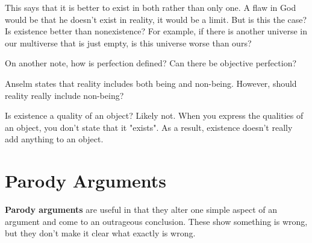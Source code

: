 \documentclass{article}
\begin{document}
This says that it is better to exist in both rather than only one. A flaw in God
would be that he doesn't exist in reality, it would be a limit. But is this the
case? Is existence better than nonexistence? For example, if there is another
universe in our multiverse that is just empty, is this universe worse than ours?

On another note, how is perfection defined? Can there be objective perfection?

Anselm states that reality includes both being and non-being. However, should
reality really include non-being?

Is existence a quality of an object? Likely not. When you express the qualities
of an object, you don't state that it "exists". As a result, existence doesn't
really add anything to an object.

\section{Parody Arguments}

\textbf{Parody arguments} are useful in that they alter one simple aspect of an
argument and come to an outrageous conclusion. These show something is wrong,
but they don't make it clear what exactly is wrong.
\end{document}
